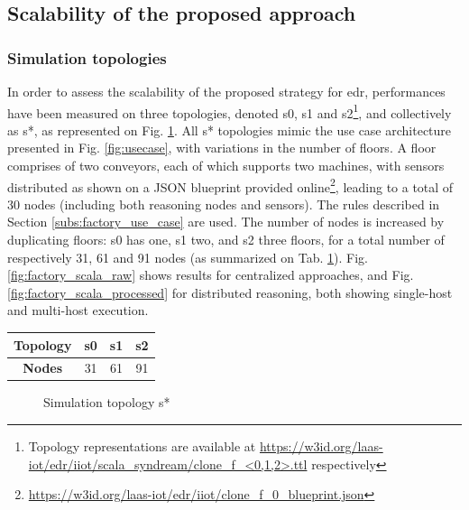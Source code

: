 \documentclass[sw]{iosart2x}
\begin{document}
\subsection{Scalability of the proposed approach}
\label{subs:factory_scalability}
\subsubsection{Simulation topologies}

In order to assess the scalability of the proposed strategy for \gls{edr}, performances have been measured on three topologies, denoted s0, s1 and s2\footnote{Topology representations are available at \url{https://w3id.org/laas-iot/edr/iiot/scala_syndream/clone_f_<0,1,2>.ttl} respectively}, and collectively as s*, as represented on Fig. \ref{fig:factory_scala_topologies}. 
All s* topologies mimic the use case architecture presented in Fig. \ref{fig:usecase}, with variations in the number of floors.
A floor comprises of two conveyors, each of which supports two machines, with sensors distributed as shown on a JSON blueprint provided online\footnote{\url{https://w3id.org/laas-iot/edr/iiot/clone_f_0_blueprint.json}}, leading to a total of 30 nodes (including both reasoning nodes and sensors).
The rules described in Section \textsection \ref{subs:factory_use_case} are used.
The number of nodes is increased by duplicating floors: s0 has one, s1 two, and s2 three floors, for a total number of respectively 31, 61 and 91 nodes (as summarized on Tab. \ref{tab:scalability_factory_size}).
Fig. \ref{fig:factory_scala_raw} shows results for centralized approaches, and Fig. \ref{fig:factory_scala_processed} for distributed reasoning, both showing single-host and multi-host execution.

\begin{table}
	\centering
	\label{tab:scalability_factory_size}
	\begin{tabular}{|c|c|c|c|}
		\hline 
		\textbf{Topology} 	& s0 & s1 & s2 \\ \hline
		\textbf{Nodes} 		& 31 & 61 & 91 \\ \hline
	\end{tabular}
\end{table}

\begin{figure}
	\centering
	\caption{Simulation topology s*}
	\label{fig:factory_scala_topologies}
	\scalebox{0.75}{
		
	}
\end{figure}
\end{document}
